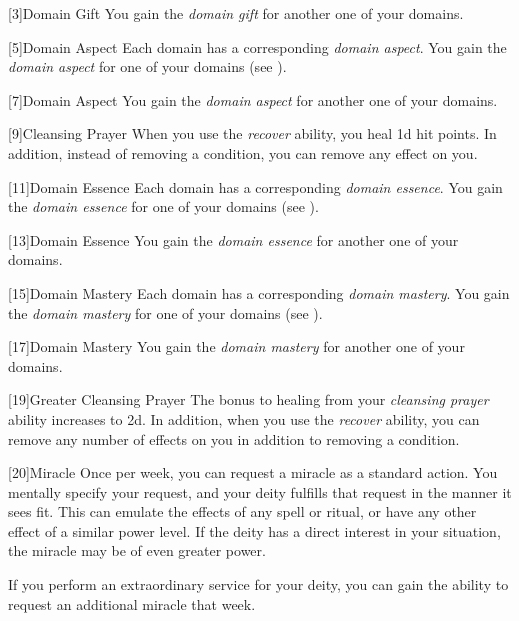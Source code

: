         [3]{Domain Gift}
        You gain the \textit{domain gift} for another one of your domains.

        [5]{Domain Aspect}
        Each domain has a corresponding \textit{domain aspect}.
        You gain the \textit{domain aspect} for one of your domains (see ).

        [7]{Domain Aspect} 
        You gain the \textit{domain aspect} for another one of your domains.

        [9]{Cleansing Prayer}
        When you use the \textit{recover} ability, you heal \plus1d hit points.
        In addition, instead of removing a condition, you can remove any  effect on you.

        [11]{Domain Essence}
        Each domain has a corresponding \textit{domain essence}.
        You gain the \textit{domain essence} for one of your domains (see ).

        [13]{Domain Essence} 
        You gain the \textit{domain essence} for another one of your domains.

        [15]{Domain Mastery}
        Each domain has a corresponding \textit{domain mastery}.
        You gain the \textit{domain mastery} for one of your domains (see ).

        [17]{Domain Mastery} 
        You gain the \textit{domain mastery} for another one of your domains.

        [19]{Greater Cleansing Prayer} 
        The bonus to healing from your \textit{cleansing prayer} ability increases to \plus2d.
        In addition, when you use the \textit{recover} ability, you can remove any number of  effects on you in addition to removing a condition.

        [20]{Miracle}
        Once per week, you can request a miracle as a standard action.
        You mentally specify your request, and your deity fulfills that request in the manner it sees fit.
        This can emulate the effects of any spell or ritual, or have any other effect of a similar power level.
        If the deity has a direct interest in your situation, the miracle may be of even greater power.

        If you perform an extraordinary service for your deity, you can gain the ability to request an additional miracle that week.

